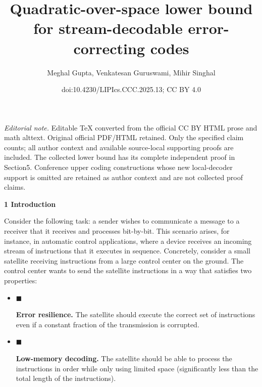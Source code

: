 \documentclass[10pt,a4paper]{article}
\title{Quadratic-over-space lower bound for stream-decodable error-correcting codes}
\author{Meghal Gupta, Venkatesan Guruswami, Mihir Singhal}
\date{doi:10.4230/LIPIcs.CCC.2025.13; CC BY 4.0}
\begin{document}
\maketitle
\noindent\textit{Editorial note.} Editable TeX converted from the official CC BY HTML prose and math alttext. Original official PDF/HTML retained. Only the specified claim counts; all author context and available source-local supporting proofs are included. The collected lower bound has its complete independent proof in Section5. Conference upper coding constructions whose new local-decoder support is omitted are retained as author context and are not collected proof claims.\par\medskip


\par\medskip\noindent\textbf{
1 Introduction}\par




Consider the following task: a sender wishes to communicate a message to a receiver that it receives and processes bit-by-bit. This scenario arises, for instance, in automatic control applications, where a device receives an incoming stream of instructions that it executes in sequence. Concretely, consider a small satellite receiving instructions from a large control center on the ground. The control center wants to send the satellite instructions in a way that satisfies two properties:\par


\begin{itemize}


\item[] 
$\blacksquare$ 


\textbf{Error resilience.} The satellite should execute the correct set of instructions even if a constant fraction of the transmission is corrupted.\par





\item[] 
$\blacksquare$ 


\textbf{Low-memory decoding.} The satellite should be able to process the instructions in order while only using limited space (significantly less than the total length of the instructions).\par





\end{itemize}
\end{document}
